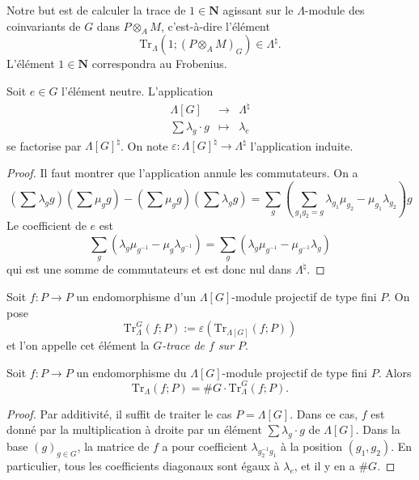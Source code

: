 \medskip\noindent
Notre but est de calculer la trace de $1 \in \mathbf{N}$ agissant sur le $\Lambda$-module
des coinvariants de $G$ dans $P \otimes_A M$, c'est-à-dire l'élément
$$
\text{Tr}_{\Lambda}\left(1; \left(P \otimes_A M\right)_G\right) \in
\Lambda^\natural.
$$
L'élément $1\in \mathbf{N}$ correspondra au Frobenius.

\begin{lemma}
\label{lemma-epsilon}
Soit $e\in G$ l'élément neutre. L'application
$$
\begin{matrix}
\Lambda[G] & \longrightarrow & \Lambda^{\natural}\\
\sum \lambda_g\cdot g & \longmapsto & \lambda_e
\end{matrix}
$$
se factorise par $\Lambda[G]^\natural$. On note
$\varepsilon : \Lambda[G]^\natural\to \Lambda^\natural$ l'application induite.
\end{lemma}

\begin{proof}
Il faut montrer que l'application annule les commutateurs. On a
$$
\left(\sum\lambda_g g\right)\left(\sum\mu_g g\right)-\left(\sum \mu_g
g\right)\left(\sum\lambda_g g\right)
= \sum_g\left(\sum_{g_1g_2=g}
\lambda_{g_1}\mu_{g_2}-\mu_{g_1}\lambda_{g_2}\right)g
$$
Le coefficient de $e$ est
$$
\sum_g\left(\lambda_g\mu_{g^{-1}}-\mu_g\lambda_{g^{-1}}\right) =
\sum_g\left(\lambda_g\mu_{g^{-1}}-\mu_{g^{-1}}\lambda_g\right)
$$
qui est une somme de commutateurs et est donc nul dans $\Lambda^\natural$.
\end{proof}

\begin{definition}
\label{definition-trace-G}
Soit $f : P\to P$ un
endomorphisme d'un $\Lambda[G]$-module projectif de type fini
$P$. On pose
$$
\text{Tr}_{\Lambda}^G(f; P) := \varepsilon\left(\text{Tr}_{\Lambda[G]}(f;
P)\right)
$$
et l'on appelle cet élément la {\it $G$-trace de $f$ sur $P$}.
\end{definition}

\begin{lemma}
\label{lemma-lambda-trace}
Soit $f : P\to P$ un endomorphisme du
$\Lambda[G]$-module projectif de type fini $P$. Alors
$$
\text{Tr}_{\Lambda}(f; P) = \# G \cdot \text{Tr}_\Lambda^G(f; P).
$$
\end{lemma}

\begin{proof}
Par additivité, il suffit de traiter le cas $P = \Lambda[G]$.
Dans ce cas, $f$ est donné par
la multiplication à droite par un élément $\sum\lambda_g\cdot g$ de $\Lambda[G]$. Dans
la base $(g)_{g \in G}$, la matrice de $f$ a pour coefficient
$\lambda_{g_2^{-1}g_1}$ à la position $(g_1, g_2)$. En particulier, tous les
coefficients diagonaux sont égaux à $\lambda_e$, et il y en a $\# G$.
\end{proof}

